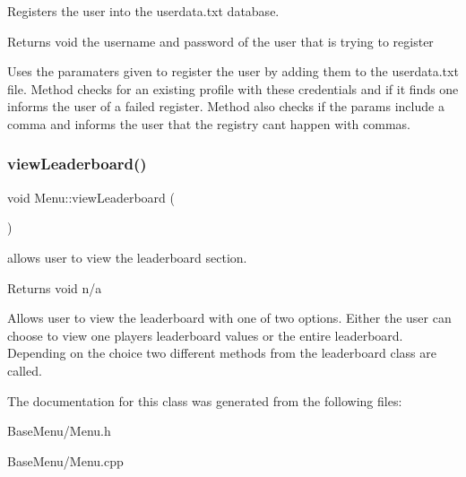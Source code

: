 Registers the user into the userdata.\+txt database. 

\begin{DoxyReturn}{Returns}
void  the username and password of the user that is trying to register
\end{DoxyReturn}
Uses the paramaters given to register the user by adding them to the userdata.\+txt file. Method checks for an existing profile with these credentials and if it finds one informs the user of a failed register. Method also checks if the params include a comma and informs the user that the registry cant happen with commas. \mbox{\label{classMenu_af8c8f162dc3243212f2da97caac85e46}} 
\subsubsection{\texorpdfstring{view\+Leaderboard()}{viewLeaderboard()}}
{\footnotesize\ttfamily void Menu\+::view\+Leaderboard (\begin{DoxyParamCaption}{ }\end{DoxyParamCaption})}



allows user to view the leaderboard section. 

\begin{DoxyReturn}{Returns}
void  n/a
\end{DoxyReturn}
Allows user to view the leaderboard with one of two options. Either the user can choose to view one players leaderboard values or the entire leaderboard. Depending on the choice two different methods from the leaderboard class are called. 

The documentation for this class was generated from the following files\+:\begin{DoxyCompactItemize}
\item 
Base\+Menu/Menu.\+h\item 
Base\+Menu/Menu.\+cpp\end{DoxyCompactItemize}
